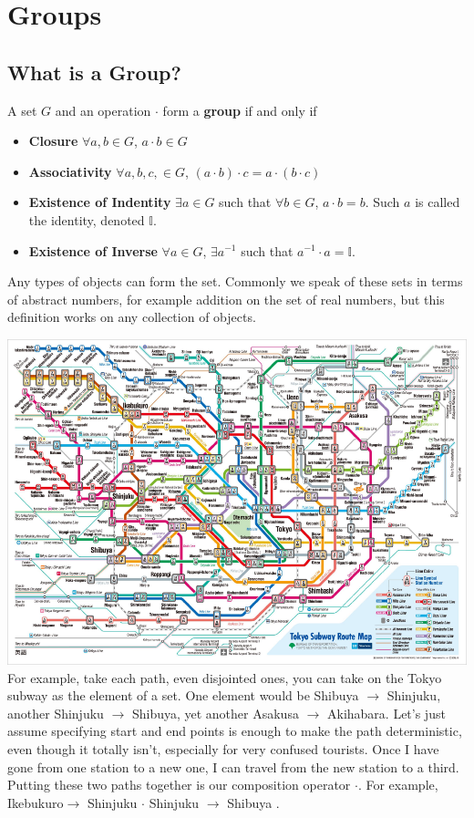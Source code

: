 \chapter{Groups}

\section{What is a Group?}

\begin{definition}[Groups]
  A set $G$ and an operation $\cdot$ form a \textbf{group} if and only if
  \begin{itemize}[noitemsep]
    \item \textbf{Closure} $\forall a,b \in G$, $a\cdot b \in G$
    \item \textbf{Associativity} $\forall a,b,c, \in G$, $(a \cdot b) \cdot c = a \cdot (b \cdot c)$
    \item \textbf{Existence of Indentity} $\exists a \in G$ such that $\forall b \in G$, $a \cdot b = b$.  Such $a$ is called the identity, denoted $\mathbb{I}$.
    \item \textbf{Existence of Inverse} $\forall a \in G$, $\exists a^{-1}$ such that $a^{-1} \cdot a = \mathbb{I}$.
  \end{itemize}
\end{definition}

Any types of objects can form the set.  Commonly we speak of these sets in terms of abstract numbers, for example addition on the set of real numbers, but this definition works on any collection of objects.


\includegraphics[width=\textwidth]{pics/tokyo_subway.png}
For example, take each path, even disjointed ones, you can take on the Tokyo subway as the element of a set. One element would be Shibuya $\rightarrow$ Shinjuku, another Shinjuku $\rightarrow$ Shibuya, yet another Asakusa $\rightarrow$ Akihabara.  Let's just assume specifying start and end points is enough to make the path deterministic, even though it totally isn't, especially for very confused tourists.  Once I have gone from one station to a new one, I can travel from the new station to a third.  Putting these two paths together is our composition operator $\cdot$.  For example, Ikebukuro$\rightarrow$ Shinjuku $\cdot$ Shinjuku $\rightarrow$ Shibuya .

